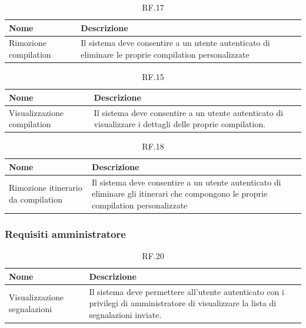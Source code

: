 \documentclass{natourDoc}
\begin{document}
	\begin{table}[H]
		\centering
		\begin{tabular}{ |p{5cm}|p{10.3cm}| }
			\hline
			\rowcolor{PineGreen!70}
			\textbf{Nome} & \textbf{Descrizione} \\
			\hline
			Rimozione compilation & Il sistema deve consentire a un utente autenticato di eliminare le proprie
			compilation personalizzate \\
			\hline
		\end{tabular}
		\caption{RF.17}
		\label{table:17}
	\end{table}

	\begin{table}[H]
		\centering
		\begin{tabular}{ |p{5cm}|p{10.3cm}| }
			\hline
			\rowcolor{PineGreen!70}
			\textbf{Nome} & \textbf{Descrizione} \\
			\hline
			Visualizzazione compilation & Il sistema deve consentire a un utente autenticato di visualizzare i dettagli
			delle proprie compilation.  \\
			\hline
		\end{tabular}
		\caption{RF.15}
		\label{table:15}
	\end{table}

	
	\begin{table}[H]
		\centering
		\begin{tabular}{ |p{5cm}|p{10.3cm}| }
			\hline
			\rowcolor{PineGreen!70}
			\textbf{Nome} & \textbf{Descrizione} \\
			\hline
			Rimozione itinerario da compilation & Il sistema deve consentire a un utente autenticato di eliminare gli itinerari
			che compongono le proprie compilation personalizzate \\
			\hline
		\end{tabular}
		\caption{RF.18}
		\label{table:18}
	\end{table}

	\subsubsection{Requisiti amministratore}
	\begin{table}[H]
		\centering
		\begin{tabular}{ |p{5cm}|p{10.3cm}| }
			\hline
			\rowcolor{PineGreen!70}
			\textbf{Nome} & \textbf{Descrizione} \\
			\hline
			Visualizzazione segnalazioni & Il sistema deve permettere all'utente autenticato con i privilegi di amministratore di visualizzare
			la lista di segnalazioni inviate.\\
			\hline
		\end{tabular}
		\caption{RF.20}
		\label{table:20}
	\end{table}
\end{document}
